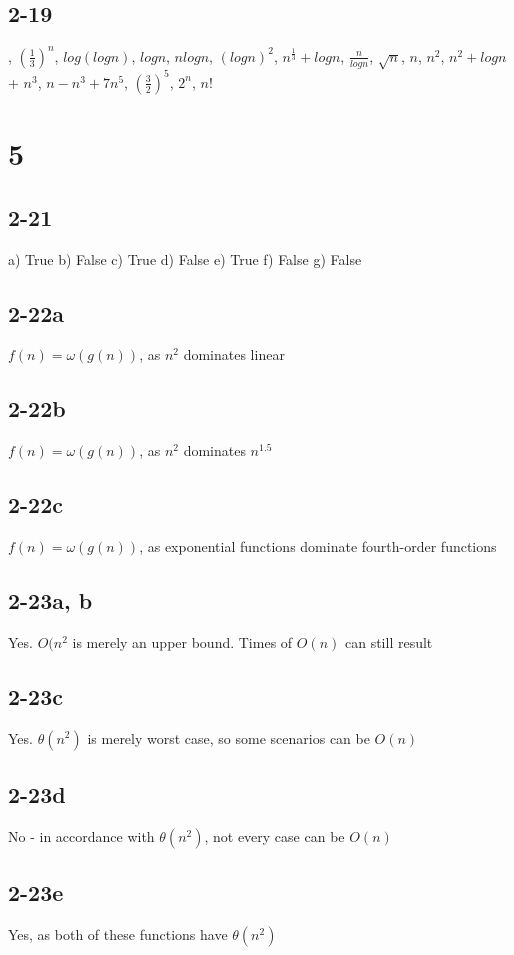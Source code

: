 \documentclass[16pt]{article}
\begin{document}
\subsection*{2-19}
, $(\frac{1}{3})^{n}$, $log(logn)$, $logn$, $nlogn$, $(logn)^{2}$, $n^{\frac{1}{3}} + logn$, $\frac{n}{logn}$, $\sqrt{n}$, $n$, $n^{2}$, $n^{2} + logn$ + $n^{3}$, $n - n^{3} + 7n^{5}$, $(\frac{3}{2})^{5}$, $2^{n}$, $n!$

\section*{5}
\subsection*{2-21}
\noindent a) True b) False c) True d) False e) True f) False g) False
\subsection*{2-22a}
\noindent $f(n) = \omega(g(n))$, as $n^{2}$ dominates linear
\subsection*{2-22b}
\noindent $f(n) = \omega(g(n))$, as $n^{2}$ dominates $n^{1.5}$
\subsection*{2-22c}
\noindent $f(n) = \omega(g(n))$, as exponential functions dominate fourth-order functions
\subsection*{2-23a, b}
\noindent Yes.  $O(n^{2}$ is merely an upper bound.  Times of $O(n)$ can still result
\subsection*{2-23c}
\noindent Yes. $\theta(n^{2})$ is merely worst case, so some scenarios can be $O(n)$
\subsection*{2-23d}
\noindent No - in accordance with $\theta(n^{2})$, not every case can be $O(n)$
\subsection*{2-23e}
\noindent Yes, as both of these functions have $\theta(n^{2})$
\end{document}
